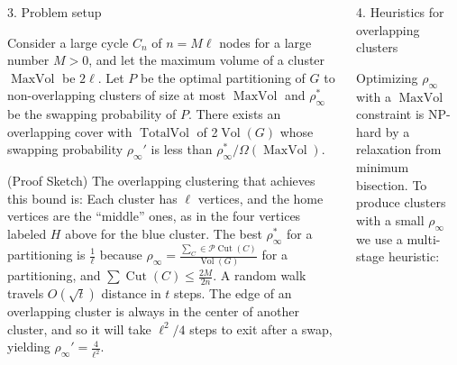 \documentclass[final,hyperref={pdfpagelabels=true},t]{beamer}
\DeclareMathOperator{\maxvol}{MaxVol}
\DeclareMathOperator{\vol}{Vol}
\DeclareMathOperator{\totalvol}{TotalVol}
\DeclareMathOperator{\cut}{Cut}
\begin{document}
\begin{frame}
\begin{columns}
\begin{block}{3. Problem setup}

{{\large {}}
Consider a large cycle $C_n$ of $n=M\ell$ nodes for a large
number $M>0$, 
and let the maximum volume of a cluster $\maxvol$ be  $2\ell$. 
Let $P$ be the optimal partitioning of $G$ to non-overlapping clusters of size at most
$\maxvol$ and $\rho_\infty^*$ be the swapping probability of $P$.  
There exists an overlapping cover with $\totalvol$ of 2$\vol(G)$ whose 
swapping probability $\rho_\infty'$  is less than $\rho_\infty^*/\Omega(\maxvol)$. 
}

(Proof Sketch) The overlapping clustering that achieves this bound is:
Each cluster has $\ell$ vertices, and the home vertices are the
``middle'' ones, as in the four vertices labeled $H$ above 
for the blue cluster.
The best $\rho_{\infty}^*$ for a partitioning is $\frac{1}{\ell}$
because $\rho_{\infty} = \frac{\sum_C \in \mathcal{P} \cut(C)}{\vol(G)}$
for a partitioning, and $\sum \cut(C) \le \frac{2M}{2n}$.
A random walk travels $O(\sqrt{t})$
distance in $t$ steps.  The edge of an overlapping cluster is 
always in the center of another cluster, 
and so it will take $\ell^2/4$
steps to exit after a swap, yielding $\rho_{\infty}' 
= \frac{4}{\ell^2}$.


\end{block}

\begin{block}{4. Heuristics for overlapping clusters}
\RaggedRight

Optimizing $\rho_{\infty}$ with a $\maxvol$ constraint 
is NP-hard by a relaxation from minimum bisection.  To 
produce clusters with a small $\rho_{\infty}$ we use
a multi-stage heuristic:


\end{block}
\end{columns}
\end{frame}
\end{document}
